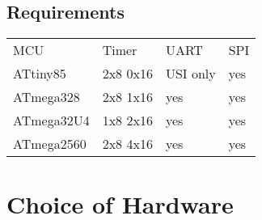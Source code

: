 \setchapterpreamble[u]{\margintoc}


\section{Requirements}

\begin{tabular}{llll}
    MCU & Timer & UART & SPI \\
    ATtiny85 & 2x8 0x16 & USI only & yes \\
    ATmega328 & 2x8 1x16 & yes & yes \\
    ATmega32U4 & 1x8 2x16 & yes & yes \\
    ATmega2560 & 2x8 4x16 & yes & yes \\
\end{tabular}

\chapter{Choice of Hardware}